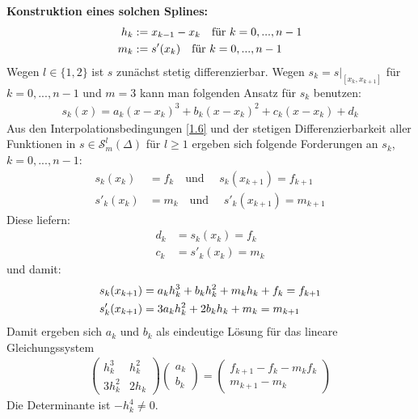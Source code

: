 \textbf{Konstruktion eines solchen Splines:}
\begin{align}
	h_k &:= x_{k-1}-x_k\quad\text{für } k=0,...,n-1 \notag \\
	m_k &:= s'(x_k) \quad\text{für } k=0,...,n-1\notag
\end{align}
Wegen $l\in\{1,2\}$ ist $s$ zunächst stetig differenzierbar. Wegen $s_k=s\vert_{[x_k,x_{k+1}]}$ für $k=0,...,n-1$ und $m=3$ kann man folgenden Ansatz für $s_k$ benutzen:
\begin{align}
	\label{1.7}
	s_k(x)=a_k(x-x_k)^3+b_k(x-x_k)^2+c_k(x-x_k)+d_k
\end{align}
Aus den Interpolationsbedingungen \cref{1.6} und der stetigen Differenzierbarkeit aller Funktionen in $s\in\mathcal{S}^l_m(\Delta)$ für $l\ge 1$ ergeben sich folgende Forderungen an $s_k$, $k=0,...,n-1$:
\begin{equation}
	\label{1.8}
	\begin{split}
		s_k(x_k) &= f_k \quad\text{und }\quad s_k(x_{k+1}) = f_{k+1} \\
		s'_k(x_k) &= m_k \quad\text{und }\quad s'_k(x_{k+1}) = m_{k+1}
	\end{split}
\end{equation}
Diese liefern:
\begin{equation}
	\label{1.9}
	\begin{split}
		d_k &= s_k(x_k)=f_k \\
		c_k &= s'_k(x_k)=m_k
	\end{split}
\end{equation}
und damit:
\begin{align}
	s_k(x_{k+1}) &= a_kh_k^3 + b_kh_k^2+m_kh_k + f_k = f_{k+1} \notag \\
	s'_k(x_{k+1}) &= 3a_kh_k^2 + 2b_kh_k + m_k = m_{k+1} \notag
\end{align}
Damit ergeben sich $a_k$ und $b_k$ als eindeutige Lösung für das lineare Gleichungssystem
\begin{align}
	\label{1.10}
	\begin{pmatrix}
		h_k^3 & h_k^2 \\ 3h_k^2 & 2h_k
	\end{pmatrix}
	\begin{pmatrix}
		a_k \\ b_k
	\end{pmatrix}=
	\begin{pmatrix}
		f_{k+1}-f_k-m_kf_k \\
		m_{k+1}-m_k
	\end{pmatrix}
\end{align}
Die Determinante ist $-h_k^4\neq 0$.


